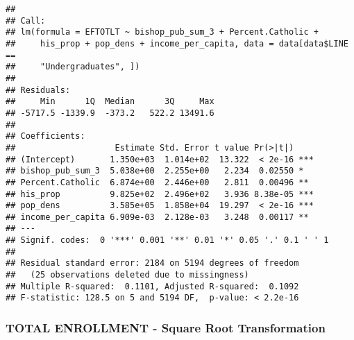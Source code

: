 \documentclass[]{article}
\newenvironment{Shaded}{\begin{snugshade}}{\end{snugshade}}
\newcommand{\KeywordTok}[1]{\textcolor[rgb]{0.13,0.29,0.53}{\textbf{#1}}}
\newcommand{\DataTypeTok}[1]{\textcolor[rgb]{0.13,0.29,0.53}{#1}}
\newcommand{\DecValTok}[1]{\textcolor[rgb]{0.00,0.00,0.81}{#1}}
\newcommand{\StringTok}[1]{\textcolor[rgb]{0.31,0.60,0.02}{#1}}
\newcommand{\OperatorTok}[1]{\textcolor[rgb]{0.81,0.36,0.00}{\textbf{#1}}}
\newcommand{\NormalTok}[1]{#1}
\begin{document}
\begin{verbatim}
## 
## Call:
## lm(formula = EFTOTLT ~ bishop_pub_sum_3 + Percent.Catholic + 
##     his_prop + pop_dens + income_per_capita, data = data[data$LINE == 
##     "Undergraduates", ])
## 
## Residuals:
##     Min      1Q  Median      3Q     Max 
## -5717.5 -1339.9  -373.2   522.2 13491.6 
## 
## Coefficients:
##                    Estimate Std. Error t value Pr(>|t|)    
## (Intercept)       1.350e+03  1.014e+02  13.322  < 2e-16 ***
## bishop_pub_sum_3  5.038e+00  2.255e+00   2.234  0.02550 *  
## Percent.Catholic  6.874e+00  2.446e+00   2.811  0.00496 ** 
## his_prop          9.825e+02  2.496e+02   3.936 8.38e-05 ***
## pop_dens          3.585e+05  1.858e+04  19.297  < 2e-16 ***
## income_per_capita 6.909e-03  2.128e-03   3.248  0.00117 ** 
## ---
## Signif. codes:  0 '***' 0.001 '**' 0.01 '*' 0.05 '.' 0.1 ' ' 1
## 
## Residual standard error: 2184 on 5194 degrees of freedom
##   (25 observations deleted due to missingness)
## Multiple R-squared:  0.1101, Adjusted R-squared:  0.1092 
## F-statistic: 128.5 on 5 and 5194 DF,  p-value: < 2.2e-16
\end{verbatim}

\subsubsection{TOTAL ENROLLMENT - Square Root
Transformation}\label{total-enrollment---square-root-transformation}

\begin{Shaded}
\end{Shaded}
\end{document}
